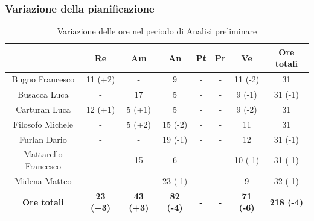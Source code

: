 \subsubsection{Variazione della pianificazione} \label{subsubsection:variazione_pianificazione_analisi}
\begin{table}[H]
  \centering
  \renewcommand{\arraystretch}{1.8}
  \begin{tabular}{c|c|c|c|c|c|c|c}
    \rowcolor[HTML]{125E28}
    \multicolumn{1}{c}{\color[HTML]{FFFFFF}\textbf{Nominativo}}
                         & \multicolumn{1}{c}{\color[HTML]{FFFFFF}\textbf{ Re }}
                         & \multicolumn{1}{c}{\color[HTML]{FFFFFF}\textbf{ Am}}
                         & \multicolumn{1}{c}{\color[HTML]{FFFFFF}\textbf{ An }}
                         & \multicolumn{1}{c}{\color[HTML]{FFFFFF}\textbf{ Pt }}
                         & \multicolumn{1}{c}{\color[HTML]{FFFFFF}\textbf{ Pr }}
                         & \multicolumn{1}{c}{\color[HTML]{FFFFFF}\textbf{ Ve }}
                         & \multicolumn{1}{c}{\color[HTML]{FFFFFF}\textbf{ Ore totali }}                                                                                                        \\
    \hline
    Bugno Francesco      & 11 (+2)                                                       & -                & 9                & -          & -          & 11 (-2)          & 31                \\
    Busacca Luca         & -                                                             & 17               & 5                & -          & -          & 9  (-1)          & 31 (-1)           \\
    Carturan Luca        & 12 (+1)                                                       & 5 (+1)           & 5                & -          & -          & 9  (-2)          & 31                \\
    Filosofo Michele     & -                                                             & 5 (+2)           & 15 (-2)          & -          & -          & 11               & 31                \\
    Furlan Dario         & -                                                             & -                & 19 (-1)          & -          & -          & 12               & 31 (-1)           \\
    Mattarello Francesco & -                                                             & 15               & 6                & -          & -          & 10 (-1)          & 31 (-1)           \\
    Midena Matteo        & -                                                             & -                & 23 (-1)          & -          & -          & 9                & 32 (-1)           \\
    \textbf{Ore totali}  & \textbf{23 (+3)}                                              & \textbf{43 (+3)} & \textbf{82 (-4)} & \textbf{-} & \textbf{-} & \textbf{71 (-6)} & \textbf{218 (-4)}
  \end{tabular}
  \caption{Variazione delle ore nel periodo di Analisi preliminare}
\end{table}

